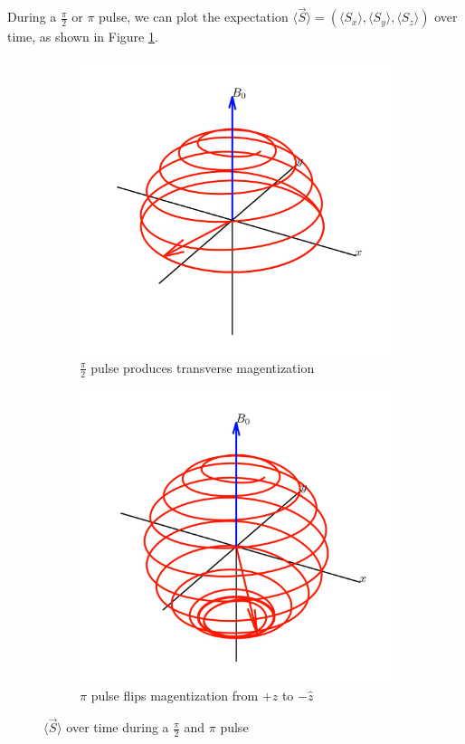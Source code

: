 \documentclass[%
 reprint,
 amsmath,amssymb,
 aps,
]{revtex4-2}
\newcommand{\halfpi}{\frac{\pi}{2}}
\begin{document}
During a $\halfpi$ or $\pi$ pulse, we can plot the expectation $\langle \vec{S} \rangle  = (\langle S_x \rangle, \langle S_y \rangle, \langle S_z \rangle)$ over time, as shown in Figure \ref{fig:pulse-spirals}.


\begin{figure}[htbp]
    \centering
    \begin{subfigure}{0.3\linewidth}
        \includegraphics[width = \linewidth]{figs/pi-2-pulse.png}
        \caption{$\halfpi$ pulse produces transverse magentization}
    \end{subfigure}
    \begin{subfigure}{0.3\linewidth}
        \includegraphics[width = \linewidth]{figs/pi-pulse.png}
        \caption{$\pi$ pulse flips magentization from $+\hat{z}$ to $-\hat{z}$}
    \end{subfigure}
    \caption{$\langle \vec{S} \rangle$ over time during a $\halfpi$ and $\pi$ pulse}\label{fig:pulse-spirals}
\end{figure}
\end{document}
